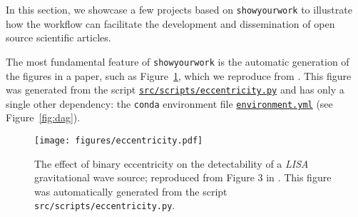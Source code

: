 \documentclass[modern]{aastex631}
\newcommand\syw{\texttt{showyourwork}\xspace}
\newcommand\fileurl[1]{https://github.com/showyourwork/showyourwork-paper/blob/\GitHubSHA/#1}
\begin{document}
In this section, we showcase a few projects based on \syw to illustrate how the workflow can facilitate the development and dissemination of open source scientific articles.

The most fundamental feature of \syw is the automatic generation of the figures in a paper, such as Figure~\ref{fig:eccentricity}, which we reproduce from \citet{Wagg2022}.
This figure was generated from the script \href{\fileurl{src/scripts/eccentricity.py}}{\texttt{src/scripts/eccentricity.py}} and has only a single other dependency: the \texttt{conda} environment file \href{\fileurl{environment.yml}}{\texttt{environment.yml}} (see Figure~\ref{fig:dag}).



\begin{figure}[htp]
    \begin{centering}
        \texttt{[image: figures/eccentricity.pdf]}
        \caption{
            The effect of binary eccentricity on the detectability of a \emph{LISA} gravitational wave source; reproduced from Figure 3 in \citet{Wagg2022}. 
            This figure was automatically generated from the script \texttt{src/scripts/eccentricity.py}.
        }
        \label{fig:eccentricity}
    \end{centering}
\end{figure}


\end{document}
